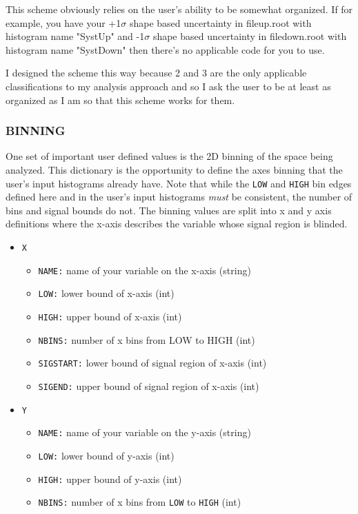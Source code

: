 \documentclass[letter]{article}
\begin{document}
            This scheme obviously relies on the user's ability to be somewhat organized. If for example, you have your +1$\sigma$ shape based uncertainty in file\textunderscore up.root with histogram name "SystUp" and -1$\sigma$ shape based uncertainty in file\textunderscore down.root with histogram name "SystDown" then there's no applicable code for you to use. 

            I designed the scheme this way because 2 and 3 are the only applicable classifications to my analysis approach and so I ask the user to be at least as organized as I am so that this scheme works for them.

        \subsubsection{BINNING}
            One set of important user defined values is the 2D binning of the space being analyzed. This dictionary is the opportunity to define the axes binning that the user's input histograms already have. Note that while the \verb"LOW" and \verb"HIGH" bin edges defined here and in the user's input histograms \textit{must} be consistent, the number of bins and signal bounds do not. The binning values are split into x and y axis definitions where the x-axis describes the variable whose signal region is blinded.
            \begin{itemize}
                \item \verb"X"
                \begin{itemize}
                    \item \verb"NAME:" name of your variable on the x-axis (string)
                    \item \verb"LOW:" lower bound of x-axis (int)
                    \item \verb"HIGH:" upper bound of x-axis (int)
                    \item \verb"NBINS:" number of x bins from LOW to HIGH (int)
                    \item \verb"SIGSTART:" lower bound of signal region of x-axis (int)
                    \item \verb"SIGEND:" upper bound of signal region of x-axis (int)
                \end{itemize}
                \item \verb"Y"
                \begin{itemize}
                    \item \verb"NAME:" name of your variable on the y-axis (string)
                    \item \verb"LOW:" lower bound of y-axis (int)
                    \item \verb"HIGH:" upper bound of y-axis (int)
                    \item \verb"NBINS:" number of x bins from \verb"LOW" to \verb"HIGH" (int)
                \end{itemize}
            \end{itemize}
\end{document}
